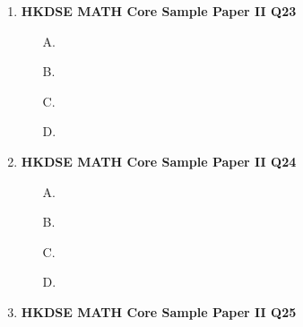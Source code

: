 \documentclass[12pt]{article}
\begin{document}
\begin{enumerate}
	\item \textbf{HKDSE MATH Core Sample Paper II Q23}\\
	
	\begin{enumerate}
		\item[A.]
		\item[B.]
		\item[C.]
		\item[D.]
	\end{enumerate}

	\item \textbf{HKDSE MATH Core Sample Paper II Q24}\\
	
	\begin{enumerate}
		\item[A.]
		\item[B.]
		\item[C.]
		\item[D.]
	\end{enumerate}

	\item \textbf{HKDSE MATH Core Sample Paper II Q25}\\
	

\end{enumerate}
\end{document}
